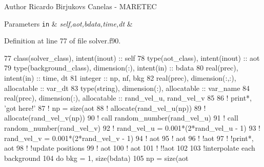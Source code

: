 \begin{DoxyAuthor}{Author}
Ricardo Birjukovs Canelas -\/ M\+A\+R\+E\+T\+EC 
\end{DoxyAuthor}

\begin{DoxyParams}[1]{Parameters}
\mbox{\tt in}  & {\em self,aot,bdata,time,dt} & \\
\hline
\end{DoxyParams}


Definition at line 77 of file solver.\+f90.


\begin{DoxyCode}
77     \textcolor{keywordtype}{class}(solver\_class), \textcolor{keywordtype}{intent(inout)} :: self
78     \textcolor{keywordtype}{type}(aot\_class), \textcolor{keywordtype}{intent(inout)} :: aot
79     \textcolor{keywordtype}{type}(background\_class), \textcolor{keywordtype}{dimension(:)}, \textcolor{keywordtype}{intent(in)} :: bdata
80     \textcolor{keywordtype}{real(prec)}, \textcolor{keywordtype}{intent(in)} :: time, dt
81     \textcolor{keywordtype}{integer} :: np, nf, bkg
82     \textcolor{keywordtype}{real(prec)}, \textcolor{keywordtype}{dimension(:,:)}, \textcolor{keywordtype}{allocatable} :: var\_dt
83     \textcolor{keywordtype}{type}(string), \textcolor{keywordtype}{dimension(:)}, \textcolor{keywordtype}{allocatable} :: var\_name
84     \textcolor{keywordtype}{real(prec)}, \textcolor{keywordtype}{dimension(:)}, \textcolor{keywordtype}{allocatable} :: rand\_vel\_u, rand\_vel\_v
85 
86     \textcolor{comment}{! print*, 'got here!'}
87     \textcolor{comment}{! np = size(aot%
88     \textcolor{comment}{! allocate(rand\_vel\_u(np))}
89     \textcolor{comment}{! allocate(rand\_vel\_v(np))}
90     \textcolor{comment}{! call random\_number(rand\_vel\_u)}
91     \textcolor{comment}{! call random\_number(rand\_vel\_v)}
92     \textcolor{comment}{! rand\_vel\_u = 0.001*(2*rand\_vel\_u - 1)}
93     \textcolor{comment}{! rand\_vel\_v = 0.001*(2*rand\_vel\_v - 1)}
94     \textcolor{comment}{! aot%
95     \textcolor{comment}{! aot%
96     \textcolor{comment}{! !aot%
97     \textcolor{comment}{! !print*, aot%
98     \textcolor{comment}{! !update positions}
99     \textcolor{comment}{! aot%
100     \textcolor{comment}{! aot%
101     \textcolor{comment}{! !!aot%
102 
103     \textcolor{comment}{!interpolate each background}
104     \textcolor{keywordflow}{do} bkg = 1, \textcolor{keyword}{size}(bdata)
105         np = \textcolor{keyword}{size}(aot%
}}}}}}}}
\end{DoxyCode}
